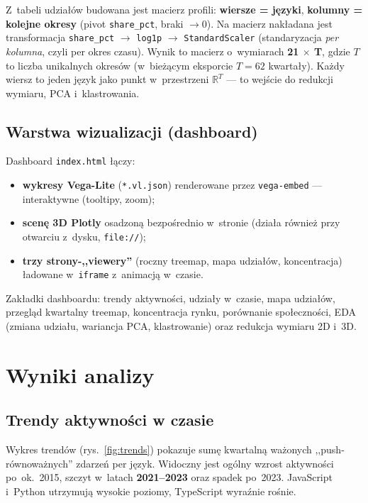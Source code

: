 \documentclass[11pt,a4paper]{article}
\begin{document}
Z~tabeli udziałów budowana jest macierz profili: \textbf{wiersze = języki},
\textbf{kolumny = kolejne okresy} (pivot \texttt{share\_pct}, braki $\rightarrow 0$).
Na macierz nakładana jest transformacja \texttt{share\_pct} $\rightarrow$ \texttt{log1p}
$\rightarrow$ \texttt{StandardScaler} (standaryzacja \emph{per kolumna}, czyli per okres
czasu). Wynik to macierz o~wymiarach \textbf{21 $\times$ T}, gdzie $T$ to liczba unikalnych
okresów (w~bieżącym eksporcie $T = 62$ kwartały). Każdy wiersz to jeden język jako punkt
w~przestrzeni $\mathbb{R}^{T}$ --- to wejście do redukcji wymiaru, PCA i~klastrowania.

\subsection{Warstwa wizualizacji (dashboard)}

Dashboard \texttt{index.html} łączy:
\begin{itemize}[nosep]
  \item \textbf{wykresy Vega-Lite} (\texttt{*.vl.json}) renderowane przez \texttt{vega-embed} --- interaktywne (tooltipy, zoom);
  \item \textbf{scenę 3D Plotly} osadzoną bezpośrednio w~stronie (działa również przy otwarciu z~dysku, \texttt{file://});
  \item \textbf{trzy strony-,,viewery''} (roczny treemap, mapa udziałów, koncentracja) ładowane w~\texttt{iframe} z~animacją w~czasie.
\end{itemize}

Zakładki dashboardu: trendy aktywności, udziały w~czasie, mapa udziałów, przegląd kwartalny
treemap, koncentracja rynku, porównanie społeczności, EDA (zmiana udziału, wariancja PCA,
klastrowanie) oraz redukcja wymiaru 2D i~3D.

\section{Wyniki analizy}

\subsection{Trendy aktywności w czasie}

Wykres trendów (rys.~\ref{fig:trends}) pokazuje sumę kwartalną ważonych ,,push-równoważnych''
zdarzeń per język. Widoczny jest ogólny wzrost aktywności po~ok.~2015, szczyt w~latach
\textbf{2021--2023} oraz spadek po~2023. JavaScript i~Python utrzymują wysokie poziomy,
TypeScript wyraźnie rośnie.
\end{document}
